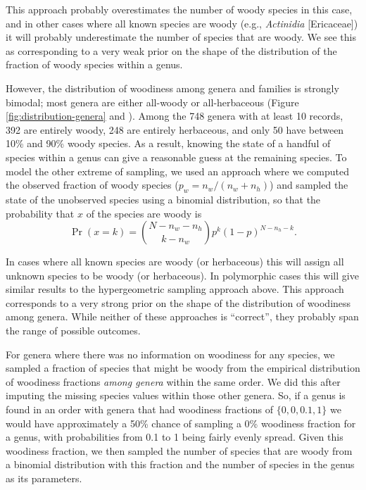 \documentclass[a4paper,12pt]{article}
\begin{document}
This approach probably overestimates the number of woody species in
this case, and in other cases where all known species are woody (e.g.,
\textit{Actinidia} [Ericaceae]) it will probably underestimate the
number of species that are woody. We see this as corresponding to a
very weak prior on the shape of the distribution of the fraction of
woody species within a genus.

However, the distribution of woodiness among genera and families is
strongly bimodal; most genera are either all-woody or all-herbaceous
(Figure \ref{fig:distribution-genera} and 
\citealt{sinnott1915evolution}).  Among the 748 genera with at least 10
records, 392 are entirely woody, 248 are entirely herbaceous, and only
50 have between 10\% and 90\% woody species. As a result, knowing the
state of a handful of species within a genus can give a reasonable
guess at the remaining species.
To model the other extreme of sampling, we used an approach where we
computed the observed fraction of woody species ($p_w = n_w / (n_w +
n_h)$) and sampled the state of the unobserved species using a
binomial distribution, so that the probability that $x$ of the species
are woody is
\begin{equation}
  \Pr(x = k) = {N - n_w - n_h \choose k - n_w} 
  p^k (1-p)^{N - n_h - k}.
\end{equation}

In cases where all known species are woody (or herbaceous) this will
assign all unknown species to be woody (or herbaceous). In polymorphic
cases this will give similar results to the hypergeometric sampling
approach above. This approach corresponds to a very strong prior on
the shape of the distribution of woodiness among genera.
While neither of these approaches is ``correct'', they probably
span the range of possible outcomes.

For genera where there was no information on woodiness for any
species, we sampled a fraction of species that might be woody from the
empirical distribution of woodiness fractions \textit{among genera}
within the same order. We did this after imputing the missing species
values within those other genera. So, if a genus is found in an order
with genera that had woodiness fractions of $\{0, 0, 0.1, 1\}$ we would
have approximately a 50\% chance of sampling a 0\% woodiness fraction
for a genus, with probabilities from 0.1 to 1 being fairly evenly
spread.  Given this woodiness fraction, we then sampled the number of
species that are woody from a binomial distribution with this fraction
and the number of species in the genus as its parameters.
\end{document}
